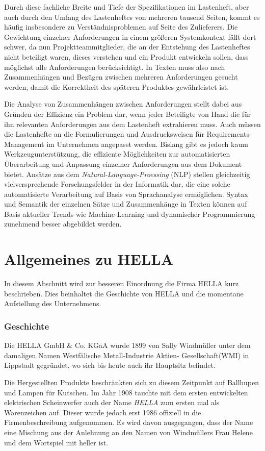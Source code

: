 \documentclass[12pt]{report}
\begin{document}
Durch diese fachliche Breite und Tiefe der Spezifikationen im Lastenheft, aber auch durch den Umfang des Lastenheftes von mehreren tausend Seiten, kommt es häufig insbesondere zu Verständnisproblemen auf Seite des Zulieferers. Die Gewichtung einzelner Anforderungen in einem größeren Systemkontext fällt dort schwer, da nun Projektteammitglieder, die an der Entstehung des Lastenheftes nicht beteiligt waren, dieses verstehen und ein Produkt entwickeln sollen, dass möglichst alle Anforderungen berücksichtigt. In Texten muss also nach Zusammenhängen und Bezügen zwischen mehreren Anforderungen gesucht werden, damit die Korrektheit des späteren Produktes gewährleistet ist.

Die Analyse von Zusammenhängen zwischen Anforderungen stellt dabei aus Gründen der Effizienz ein Problem dar, wenn jeder Beteiligte von Hand die für ihn relevanten Anforderungen aus dem Lastenheft extrahieren muss. Auch müssen die Lastenhefte an die Formulierungen und Ausdrucksweisen für Requirements-Management im Unternehmen angepasst werden. Bislang gibt es jedoch kaum Werkzeugunterstützung, die effiziente Möglichkeiten zur automatisierten Überarbeitung und Anpassung einzelner Anforderungen aus dem Dokument bietet. Ansätze aus dem \textit{Natural-Language-Proessing} (NLP) stellen gleichzeitig vielversprechende Forschungsfelder in der Informatik dar, die eine solche automatisierte Verarbeitung auf Basis von Sprachanalyse ermöglichen. Syntax und Semantik der einzelnen Sätze und Zusammenhänge in Texten können auf Basis aktueller Trends wie Machine-Learning und dynamischer Programmierung zunehmend besser abgebildet werden.
\section{Allgemeines zu HELLA}
In diesem Abschnitt wird zur besseren Einordnung die Firma HELLA kurz beschrieben. Dies beinhaltet die Geschichte von HELLA und die momentane Aufstellung des Unternehmens. \cite{he18} \cite{he19}

\subsubsection{Geschichte}
Die HELLA GmbH \& Co. KGaA wurde 1899 von Sally Windmüller unter dem damaligen Namen \glqq Westfälische Metall-Industrie Aktien- Gesellschaft(WMI)\grqq{} in Lippstadt gegründet, wo sich bis heute auch ihr Hauptsitz befindet. 

Die Hergestellten Produkte beschränkten sich zu diesem Zeitpunkt auf Ballhupen und Lampen für Kutschen. Im Jahr 1908 tauchte mit dem ersten entwickelten elektrischen Scheinwerfer auch der Name \textit{HELLA} zum ersten mal als Warenzeichen auf. Dieser wurde jedoch erst 1986 offiziell in die Firmenbeschreibung aufgenommen. Es wird davon ausgegangen, dass der Name eine Mischung aus der Anlehnung an den Namen von Windmüllers Frau Helene und dem Wortspiel mit \glqq heller\grqq{} ist. 
\end{document}
